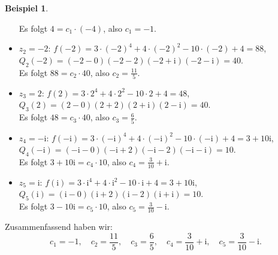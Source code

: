 \documentclass{article}
\theoremstyle{plain}
\theoremstyle{definition}
\newtheorem{example}{Beispiel}
\newcommand{\iu}{\mathrm{i}}
\begin{document}
\begin{example}
\begin{itemize}
		      Es folgt $4 = c_1 \cdot (-4)$, also $c_1 = -1.$
		\item $z_2 = -2$: $f(-2) = 3 \cdot (-2)^4 + 4 \cdot (-2)^2 - 10 \cdot (-2) + 4 = 88$, \qquad $Q_2(-2) = (-2 - 0)(-2 - 2)(-2 + \iu)(-2 - \iu) = 40$.\\
		      Es folgt $88 = c_2 \cdot 40$, also $c_2 = \frac{11}{5}.$
		\item $z_3 = 2$: $f(2) = 3 \cdot 2^4 + 4 \cdot 2^2 - 10 \cdot 2 + 4 = 48$, \qquad $Q_3(2) = (2 - 0)(2 + 2)(2 + \iu)(2 - \iu) = 40$.\\
		      Es folgt $48 = c_3 \cdot 40$, also $c_3 = \frac{6}{5}.$
		\item $z_4 = -\iu$: $f(-\iu) = 3 \cdot (-\iu)^4 + 4 \cdot (-\iu)^2 - 10 \cdot (-\iu) + 4 = 3 + 10 \iu$, \qquad $Q_4(-\iu) = (-\iu - 0)(-\iu + 2)(-\iu - 2)(-\iu - \iu) = 10$.\\
		      Es folgt $3 + 10\iu = c_4 \cdot 10$, also $c_4 = \frac{3}{10} + \iu.$
		\item $z_5 = \iu$: $f(\iu) = 3 \cdot \iu^4 + 4 \cdot \iu^2 - 10 \cdot \iu + 4 = 3 + 10 \iu$, \qquad $Q_5(\iu) = (\iu - 0)(\iu + 2)(\iu - 2)(\iu + \iu) = 10$.\\
		      Es folgt $3 - 10\iu = c_5 \cdot 10$, also $c_5 = \frac{3}{10} - \iu.$
	\end{itemize}
	Zusammenfassend haben wir:
	\[
		c_1 = -1, \quad c_2 = \frac{11}{5}, \quad c_3 = \frac{6}{5}, \quad c_4 = \frac{3}{10} + \iu, \quad c_5 = \frac{3}{10} - \iu.
	\]

\end{example}
\end{document}
